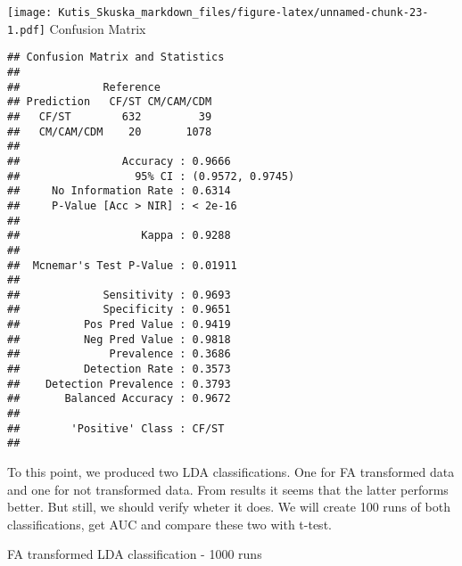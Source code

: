 \documentclass[
]{article}
\newenvironment{Shaded}{\begin{snugshade}}{\end{snugshade}}
\newcommand{\AttributeTok}[1]{\textcolor[rgb]{0.77,0.63,0.00}{#1}}
\newcommand{\FunctionTok}[1]{\textcolor[rgb]{0.00,0.00,0.00}{#1}}
\newcommand{\NormalTok}[1]{#1}
\newcommand{\OtherTok}[1]{\textcolor[rgb]{0.56,0.35,0.01}{#1}}
\newcommand{\SpecialCharTok}[1]{\textcolor[rgb]{0.00,0.00,0.00}{#1}}
\newcommand{\StringTok}[1]{\textcolor[rgb]{0.31,0.60,0.02}{#1}}
\begin{document}
\texttt{[image: Kutis\_Skuska\_markdown\_files/figure-latex/unnamed-chunk-23-1.pdf]}
Confusion Matrix

\begin{Shaded}
\end{Shaded}

\begin{verbatim}
## Confusion Matrix and Statistics
## 
##             Reference
## Prediction   CF/ST CM/CAM/CDM
##   CF/ST        632         39
##   CM/CAM/CDM    20       1078
##                                           
##                Accuracy : 0.9666          
##                  95% CI : (0.9572, 0.9745)
##     No Information Rate : 0.6314          
##     P-Value [Acc > NIR] : < 2e-16         
##                                           
##                   Kappa : 0.9288          
##                                           
##  Mcnemar's Test P-Value : 0.01911         
##                                           
##             Sensitivity : 0.9693          
##             Specificity : 0.9651          
##          Pos Pred Value : 0.9419          
##          Neg Pred Value : 0.9818          
##              Prevalence : 0.3686          
##          Detection Rate : 0.3573          
##    Detection Prevalence : 0.3793          
##       Balanced Accuracy : 0.9672          
##                                           
##        'Positive' Class : CF/ST           
## 
\end{verbatim}

To this point, we produced two LDA classifications. One for FA
transformed data and one for not transformed data. From results it seems
that the latter performs better. But still, we should verify wheter it
does. We will create 100 runs of both classifications, get AUC and
compare these two with t-test.

FA transformed LDA classification - 1000 runs
\end{document}
